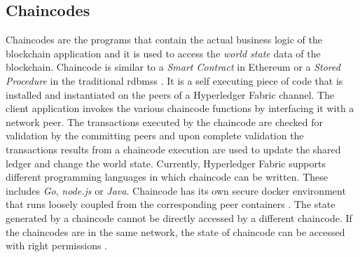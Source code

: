 \documentclass[
  a4paper,  %
  twoside,  %
  bibliography=totoc,
  headsepline,
  cleardoublepage=empty,
  parskip=half,
  draft=false
]{scrbook}
\begin{document}
\subsection{Chaincodes}
Chaincodes are the programs that contain the actual business logic of the blockchain application and it is used to access the \textit{world state} data of the blockchain. Chaincode is similar to a \textit{Smart Contract} in Ethereum or a \textit{Stored Procedure} in the traditional \glspl{rdbms} \cite{HF}. It is a self executing piece of code that is installed and instantiated on the peers of a Hyperledger Fabric channel. The client application invokes the various chaincode functions by interfacing it with a network peer. The transactions executed by the chaincode are checked for validation by the committing peers and upon complete validation the transactions results from a chaincode execution are used to update the shared ledger and change the world state. Currently, Hyperledger Fabric supports different programming languages in which chaincode can be written. These includes \textit{Go}, \textit{node.js} or \textit{Java}. Chaincode has its own secure docker environment that runs loosely coupled from the corresponding peer containers \cite{HF}. The state generated by a chaincode cannot be directly accessed by a different chaincode. If the chaincodes are in the same network, the state of chaincode can be accessed with right permissions \cite{Chaincode}. 
\end{document}
